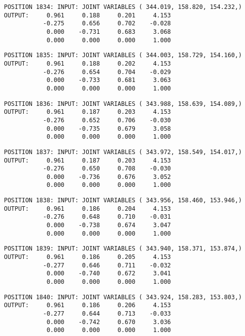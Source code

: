 \begin{verbatim}
POSITION 1834: INPUT: JOINT VARIABLES ( 344.019, 158.820, 154.232,)
OUTPUT:     0.961     0.188     0.201     4.153
           -0.275     0.656     0.702    -0.028
            0.000    -0.731     0.683     3.068
            0.000     0.000     0.000     1.000
\end{verbatim} \pagebreak[1]\begin{verbatim}
POSITION 1835: INPUT: JOINT VARIABLES ( 344.003, 158.729, 154.160,)
OUTPUT:     0.961     0.188     0.202     4.153
           -0.276     0.654     0.704    -0.029
            0.000    -0.733     0.681     3.063
            0.000     0.000     0.000     1.000
\end{verbatim} \pagebreak[1]\begin{verbatim}
POSITION 1836: INPUT: JOINT VARIABLES ( 343.988, 158.639, 154.089,)
OUTPUT:     0.961     0.187     0.203     4.153
           -0.276     0.652     0.706    -0.030
            0.000    -0.735     0.679     3.058
            0.000     0.000     0.000     1.000
\end{verbatim} \pagebreak[1]\begin{verbatim}
POSITION 1837: INPUT: JOINT VARIABLES ( 343.972, 158.549, 154.017,)
OUTPUT:     0.961     0.187     0.203     4.153
           -0.276     0.650     0.708    -0.030
            0.000    -0.736     0.676     3.052
            0.000     0.000     0.000     1.000
\end{verbatim} \pagebreak[1]\begin{verbatim}
POSITION 1838: INPUT: JOINT VARIABLES ( 343.956, 158.460, 153.946,)
OUTPUT:     0.961     0.186     0.204     4.153
           -0.276     0.648     0.710    -0.031
            0.000    -0.738     0.674     3.047
            0.000     0.000     0.000     1.000
\end{verbatim} \pagebreak[1]\begin{verbatim}
POSITION 1839: INPUT: JOINT VARIABLES ( 343.940, 158.371, 153.874,)
OUTPUT:     0.961     0.186     0.205     4.153
           -0.277     0.646     0.711    -0.032
            0.000    -0.740     0.672     3.041
            0.000     0.000     0.000     1.000
\end{verbatim} \pagebreak[1]\begin{verbatim}
POSITION 1840: INPUT: JOINT VARIABLES ( 343.924, 158.283, 153.803,)
OUTPUT:     0.961     0.186     0.206     4.153
           -0.277     0.644     0.713    -0.033
            0.000    -0.742     0.670     3.036
            0.000     0.000     0.000     1.000
\end{verbatim} \pagebreak[1]\begin{verbatim}

\end{verbatim}
